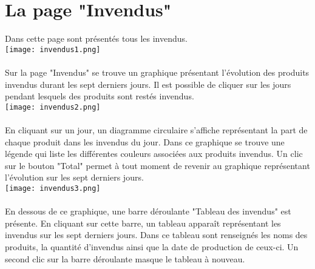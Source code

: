 \section{La page "Invendus"}
Dans cette page sont présentés tous les invendus.\\
\texttt{[image: invendus1.png]}
\paragraph{}
Sur la page "Invendus" se trouve un graphique présentant l'évolution des produits
invendus durant les sept derniers jours. Il est possible de cliquer sur les
jours pendant lesquels des produits sont restés invendus.\\
\texttt{[image: invendus2.png]}
\paragraph{}
En cliquant sur un jour, un diagramme circulaire s'affiche représentant la part de chaque produit dans les
invendus du jour. Dans ce graphique se trouve une légende qui liste les
différentes couleurs associées aux produits invendus. Un clic sur le bouton
"Total" permet à tout moment de revenir au graphique représentant l'évolution
sur les sept derniers jours.\\
\texttt{[image: invendus3.png]}
\paragraph{}
En dessous de ce graphique, une barre déroulante "Tableau des invendus" est
présente. En cliquant sur cette barre, un tableau apparaît représentant les
invendus sur les sept derniers jours. Dans ce tableau sont renseignés les noms
des produits, la quantité d'invendus ainsi que la date de production de ceux-ci.
Un second clic sur la barre déroulante masque le tableau à nouveau.
